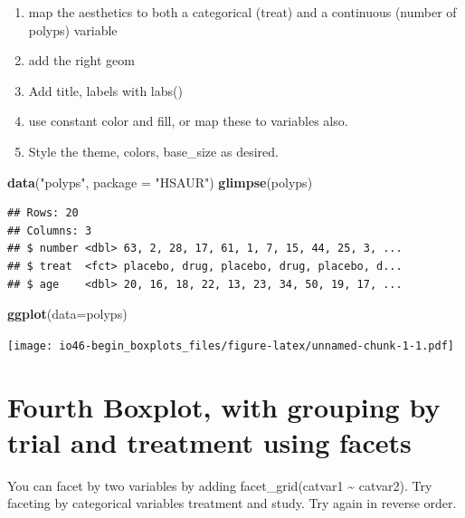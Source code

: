 \documentclass[
]{book}
\newenvironment{Shaded}{\begin{snugshade}}{\end{snugshade}}
\newcommand{\DataTypeTok}[1]{\textcolor[rgb]{0.13,0.29,0.53}{#1}}
\newcommand{\KeywordTok}[1]{\textcolor[rgb]{0.13,0.29,0.53}{\textbf{#1}}}
\newcommand{\NormalTok}[1]{#1}
\newcommand{\StringTok}[1]{\textcolor[rgb]{0.31,0.60,0.02}{#1}}
\providecommand{\tightlist}{%
  \setlength{\itemsep}{0pt}\setlength{\parskip}{0pt}}
\begin{document}
\begin{enumerate}
\def\labelenumi{\arabic{enumi}.}
\tightlist
\item
  map the aesthetics to both a categorical (treat) and a continuous (number of polyps) variable
\item
  add the right geom
\item
  Add title, labels with labs()
\item
  use constant color and fill, or map these to variables also.
\item
  Style the theme, colors, base\_size as desired.
\end{enumerate}

\begin{Shaded}
\begin{Highlighting}[]
\KeywordTok{data}\NormalTok{(}\StringTok{"polyps"}\NormalTok{, }\DataTypeTok{package =} \StringTok{"HSAUR"}\NormalTok{)}
\KeywordTok{glimpse}\NormalTok{(polyps)}
\end{Highlighting}
\end{Shaded}

\begin{verbatim}
## Rows: 20
## Columns: 3
## $ number <dbl> 63, 2, 28, 17, 61, 1, 7, 15, 44, 25, 3, ...
## $ treat  <fct> placebo, drug, placebo, drug, placebo, d...
## $ age    <dbl> 20, 16, 18, 22, 13, 23, 34, 50, 19, 17, ...
\end{verbatim}

\begin{Shaded}
\begin{Highlighting}[]
\KeywordTok{ggplot}\NormalTok{(}\DataTypeTok{data=}\NormalTok{polyps)}
\end{Highlighting}
\end{Shaded}

\texttt{[image: io46-begin\_boxplots\_files/figure-latex/unnamed-chunk-1-1.pdf]}

\hypertarget{fourth-boxplot-with-grouping-by-trial-and-treatment-using-facets}{%
\section{Fourth Boxplot, with grouping by trial and treatment using facets}\label{fourth-boxplot-with-grouping-by-trial-and-treatment-using-facets}}

You can facet by two variables by adding facet\_grid(catvar1 \textasciitilde{} catvar2). Try faceting by categorical variables treatment and study. Try again in reverse order.
\end{document}
